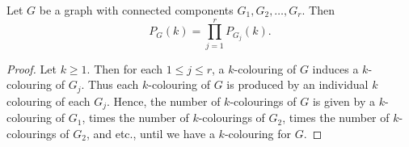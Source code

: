 \documentclass{unswmaths}
\begin{document}
\begin{lemma}[Part (c)]
\label{3c}
    Let $G$ be a graph with connected components $G_1,G_2,\ldots,G_r$.
    Then 
    \begin{equation*}
        P_G(k) = \prod_{j=1}^r P_{G_j}(k).
    \end{equation*}
\end{lemma}
\begin{proof}
    Let $k \geq 1$. Then for each $1 \leq j \leq r$, a $k$-colouring
    of $G$ induces a $k$-colouring of $G_j$. Thus each $k$-colouring
    of $G$ is produced by an individual $k$ colouring of each $G_j$. 
    Hence, the number of $k$-colourings of $G$ is given by a $k$-colouring
    of $G_1$, times the number of $k$-colourings of $G_2$, times 
    the number of $k$-colourings of $G_2$, and etc., until we have
    a $k$-colouring for $G$.
\end{proof}
\end{document}
